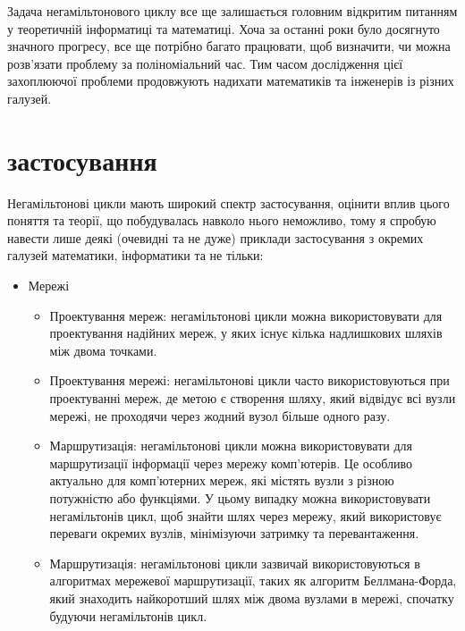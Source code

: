 \documentclass[14pt]{article}
\begin{document}
\begin{spacing}{1.175}
        Задача негамільтонового циклу все ще залишається головним відкритим питанням у теоретичній інформатиці та математиці. Хоча за останні роки було досягнуто значного прогресу, все ще потрібно багато працювати, щоб визначити, чи можна розв’язати проблему за поліноміальний час. Тим часом дослідження цієї захоплюючої проблеми продовжують надихати математиків та інженерів із різних галузей.
    
    \section{ застосування}
    Негамільтонові цикли мають широкий спектр застосування, оцінити вплив цього поняття та теорії, що побудувалась навколо нього неможливо, тому я спробую навести лише деякі (очевидні та не дуже) приклади застосування з окремих галузей математики, інформатики та не тільки:
    \begin{itemize}
       
        \item Мережі
        \begin{itemize}
            
            \item Проектування мереж: негамільтонові цикли можна використовувати для проектування надійних мереж, у яких існує кілька надлишкових шляхів між двома точками.
        
            \item Проектування мережі: негамільтонові цикли часто використовуються при проектуванні мереж, де метою є створення шляху, який відвідує всі вузли мережі, не проходячи через жодний вузол більше одного разу.
        
            \item Маршрутизація: негамільтонові цикли можна використовувати для маршрутизації інформації через мережу комп’ютерів. Це особливо актуально для комп’ютерних мереж, які містять вузли з різною потужністю або функціями. У цьому випадку можна використовувати негамільтонів цикл, щоб знайти шлях через мережу, який використовує переваги окремих вузлів, мінімізуючи затримку та перевантаження.
        
            \item Маршрутизація: негамільтонові цикли зазвичай використовуються в алгоритмах мережевої маршрутизації, таких як алгоритм Беллмана-Форда, який знаходить найкоротший шлях між двома вузлами в мережі, спочатку будуючи негамільтонів цикл.
            

\end{itemize}
\end{itemize}
\end{spacing}
\end{document}
